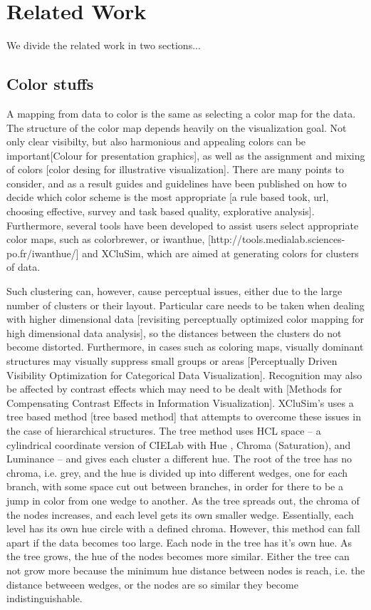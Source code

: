 \documentclass[review,journal]{vgtc}         %
\begin{document}
\section{Related Work}

We divide the related work in two sections...

\subsection{Color stuffs}


A mapping from data to color is the same as selecting a color map for the data. The structure of the color map depends heavily on the visualization goal. Not only clear visibilty, but also harmonious and appealing colors can be important[Colour for presentation graphics], as well as the assignment and mixing of colors [color desing for illustrative visualization]. There are many points to consider, and as a result guides and guidelines have been published on how to decide which color scheme is the most appropriate [a rule based took, url, choosing effective, survey and task based quality, explorative analysis]. Furthermore, several tools have been developed to assist users select appropriate color maps, such as colorbrewer, or iwanthue, [http://tools.medialab.sciences-po.fr/iwanthue/] and XCluSim, which are aimed at generating colors for clusters of data. 


Such clustering can, however, cause perceptual issues, either due to the large number of clusters or their layout. 
Particular care needs to be taken when dealing with higher dimensional data [revisiting perceptually optimized color mapping for high dimensional data analysis], so the distances between the clusters do not become distorted. 
Furthermore, in cases such as coloring maps, visually dominant structures may visually suppress small groups or areas [Perceptually Driven Visibility Optimization for Categorical Data Visualization].
Recognition may also be affected by contrast effects which may need to be dealt with [Methods for Compensating Contrast Effects in Information Visualization].
XCluSim’s uses a tree based method [tree based method] that attempts to overcome these issues in the case of hierarchical structures. 
The tree method uses HCL space – a cylindrical coordinate version of CIELab with Hue , Chroma (Saturation), and Luminance – and gives each cluster a different hue. 
The root of the tree has no chroma, i.e. grey, and the hue is divided up into different wedges, one for each branch, with some space cut out between branches, in order for there to be a jump in color from one wedge to another. 
As the tree spreads out, the chroma of the nodes increases, and each level gets its own smaller wedge. Essentially, each level has its own hue circle with a defined chroma. However, this method can fall apart if the data becomes too large. Each node in the tree has it's own hue. As the tree grows, the hue of the nodes becomes more similar. Either the tree can not grow more because the minimum hue distance between nodes is reach, i.e. the distance betweeen wedges, or the nodes are so similar they become indistinguishable. 
\end{document}

